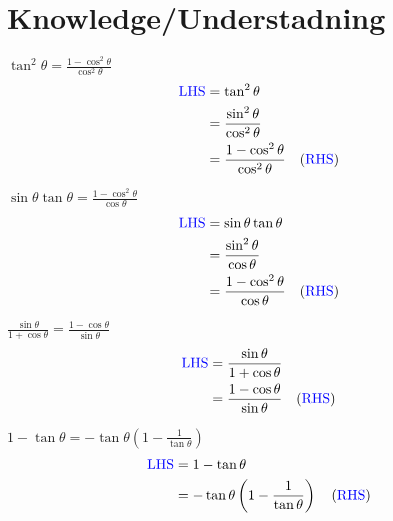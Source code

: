\documentclass{article}
\begin{document}
\section{Knowledge/Understadning }
\begin{multienum}
    \item $\tan^2 \theta = \frac{1 - \cos^2 \theta}{\cos^2 \theta}$
    \begin{align*}
        \text{\textcolor{blue}{LHS}} &= \tan^2 \theta \\
        &= \frac{\sin^2 \theta}{\cos^2 \theta} \\
        &= \frac{1 - \cos^2 \theta}{\cos^2 \theta} \quad (\text{\textcolor{blue}{RHS}})
    \end{align*}

    \item $\sin \theta \tan \theta = \frac{1 - \cos^2 \theta}{\cos \theta}$
    \begin{align*}
        \text{\textcolor{blue}{LHS}} &= \sin \theta \tan \theta \\
        &= \frac{\sin^2 \theta}{\cos \theta} \\
        &= \frac{1 - \cos^2 \theta}{\cos \theta} \quad (\text{\textcolor{blue}{RHS}})
    \end{align*}

    \item $\frac{\sin \theta}{1 + \cos \theta} = \frac{1 - \cos \theta}{\sin \theta}$
    \begin{align*}
        \text{\textcolor{blue}{LHS}} &= \frac{\sin \theta}{1 + \cos \theta} \\
        &= \frac{1 - \cos \theta}{\sin \theta} \quad (\text{\textcolor{blue}{RHS}})
    \end{align*}

    \item $1 - \tan \theta = -\tan \theta \left(1 - \frac{1}{\tan \theta} \right)$
    \begin{align*}
        \text{\textcolor{blue}{LHS}} &= 1 - \tan \theta \\
        &= -\tan \theta \left(1 - \frac{1}{\tan \theta} \right) \quad (\text{\textcolor{blue}{RHS}})
    \end{align*}
\end{multienum}
\end{document}
